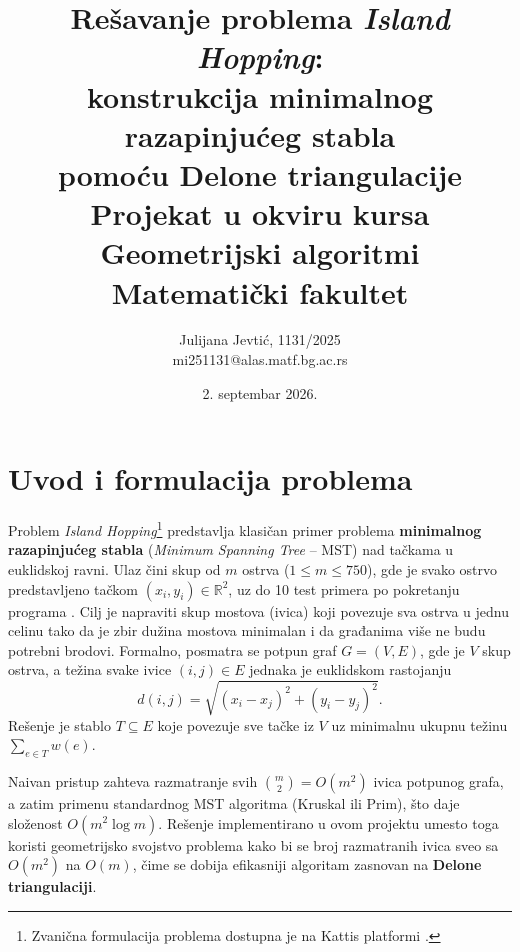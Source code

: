 \documentclass[11pt]{article}
\theoremstyle{definition}
\begin{document}
\sloppy

\title{\vspace{-1.5cm}Rešavanje problema \emph{Island Hopping}: \\ konstrukcija minimalnog razapinjućeg stabla \\ pomoću Delone triangulacije
\\[0.3cm]
\small{Projekat u okviru kursa Geometrijski algoritmi\\ Matematički fakultet}}
\author{Julijana Jevtić, 1131/2025\\ mi251131@alas.matf.bg.ac.rs}
\date{2. septembar 2026.}
\maketitle

\vspace{-0.5cm}
\tableofcontents
\vspace{0.5cm}
\section{Uvod i formulacija problema}

Problem \emph{Island Hopping}\footnote{Zvanična formulacija problema dostupna je na Kattis platformi \cite{kattis}.} predstavlja klasičan primer problema \textbf{minimalnog razapinjućeg stabla} (\emph{Minimum Spanning Tree} -- MST) nad tačkama u euklidskoj ravni. Ulaz čini skup od $m$ ostrva ($1 \le m \le 750$), gde je svako ostrvo predstavljeno tačkom $(x_i, y_i) \in \mathbb{R}^2$, uz do 10 test primera po pokretanju programa \cite{kattis}. Cilj je napraviti skup mostova (ivica) koji povezuje sva ostrva u jednu celinu tako da je zbir dužina mostova minimalan i da građanima više ne budu potrebni brodovi. Formalno, posmatra se potpun graf $G = (V, E)$, gde je $V$ skup ostrva, a težina svake ivice $(i,j) \in E$ jednaka je euklidskom rastojanju
\[
d(i,j) = \sqrt{(x_i - x_j)^2 + (y_i - y_j)^2}.
\]
Rešenje je stablo $T \subseteq E$ koje povezuje sve tačke iz $V$ uz minimalnu ukupnu težinu $\sum_{e \in T} w(e)$.

Naivan pristup zahteva razmatranje svih $\binom{m}{2} = O(m^2)$ ivica potpunog grafa, a zatim primenu standardnog MST algoritma (Kruskal ili Prim), što daje složenost $O(m^2 \log m)$. Rešenje implementirano u ovom projektu umesto toga koristi geometrijsko svojstvo problema kako bi se broj razmatranih ivica sveo sa $O(m^2)$ na $O(m)$, čime se dobija efikasniji algoritam zasnovan na \textbf{Delone triangulaciji}.
\end{document}
